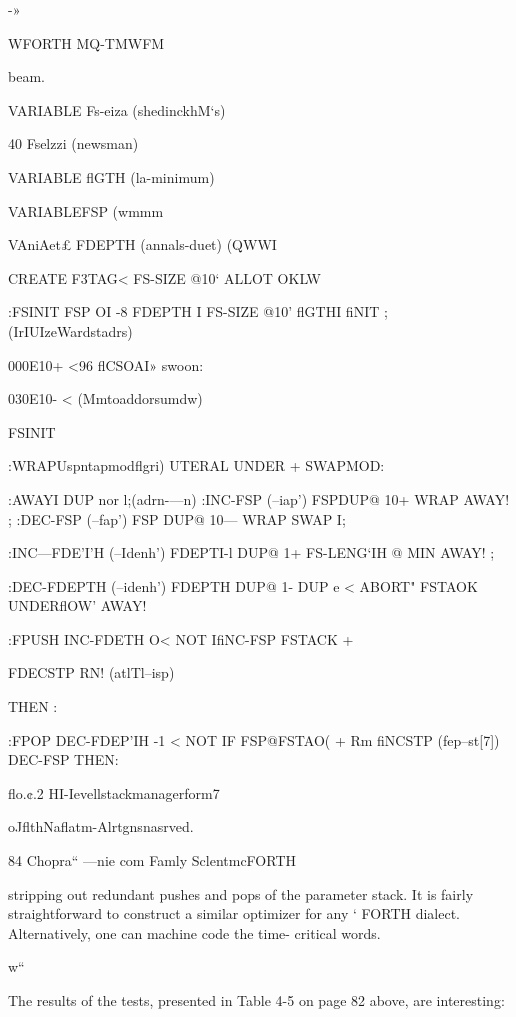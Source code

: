 {-»

 

WFORTH MQ-TMWFM

 

\noAnmmsermman

beam.

VARIABLE Fs-eiza (shedinckhM‘s)

40 Fselzzi (newsman)

VARIABLE flGTH (la-minimum)

VARIABLEFSP (wmmm

VAniAet£ FDEPTH (annals-duet)
(QWWI

CREATE F3TAG< FS-SIZE @10‘ ALLOT OKLW

:FSINIT FSP OI -8 FDEPTH I FS-SIZE @10'
flGTHI fiNIT ; (IrIUIzeWardstadrs)

000E10+ <96 flCSOAI» swoon:

030E10- <%
(Mmtoaddorsumdw)

FSINIT

:WRAPUspntapmodflgri) \rmkeiatnckdrcuar
[flGTH@] UTERAL UNDER + SWAPMOD:

:AWAYI DUP nor l;(adrn-—n) \ueeiuieetoredwoie
:INC-FSP (--iap') FSPDUP@ 10+ WRAP AWAY! ;
:DEC-FSP (--fap') FSP DUP@ 10— WRAP SWAP I;

:INC—FDE’I'H (--Idenh')
FDEPTI-l DUP@ 1+ FS-LENG‘IH @ MIN
AWAY! ;

:DEC-FDEPTH (--idenh')
FDEPTH DUP@ 1- DUP e <
ABORT" FSTAOK UNDERflOW' AWAY!

:FPUSH INC-FDETH O< NOT
IfiNC-FSP FSTACK +

FDECSTP RN! (atlTl--isp)

THEN :

:FPOP DEC-FDEP'IH -1 < NOT
IF FSP@FSTAO( +
Rm fiNCSTP (fep--st[7])
DEC-FSP THEN:

 

 

 

flo.¢.2 HI-Ievellstackmanagerform7

oJflthNaflatm-Alrtgnsnasrved.

84 Chopra“ —nie com Famly SclentmcFORTH

stripping out redundant pushes and pops of the parameter stack.
It is fairly straightforward to construct a similar optimizer for any ‘
FORTH dialect. Alternatively, one can machine code the time-
critical words.

w“

The results of the tests, presented in Table 4-5 on page 82 above,
are interesting:

}
